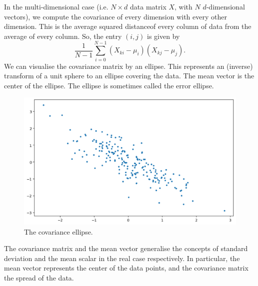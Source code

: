 \documentclass[a4paper, openany]{memoir}
\begin{document}
    In the multi-dimensional case (i.e. $N \times d$ data matrix $X$, with $N$ $d$-dimensional vectors), we compute the covariance of every dimension with every other dimension. This is the average squared distanceof every column of data from the average of every column. So, the entry $(i, j)$ is given by
    \[\frac{1}{N-1} \sum_{i=0}^{N-1} (X_{ki} - \mu_i) (X_{kj} - \mu_j).\]
    We can visualise the covariance matrix by an ellipse. This represents an (inverse) transform of a unit sphere to an ellipse covering the data. The mean vector is the center of the ellipse. The ellipse is sometimes called the error ellipse.
    \begin{figure}[H]
        \centering
        \includegraphics[scale=0.5]{src/3.20 covariance ellipse.png}
        \caption{The covariance ellipse.}
    \end{figure}

    The covariance matrix and the mean vector generalise the concepts of standard deviation and the mean scalar in the real case respectively. In particular, the mean vector represents the center of the data points, and the covariance matrix the spread of the data.
   \newpage 
\end{document}
